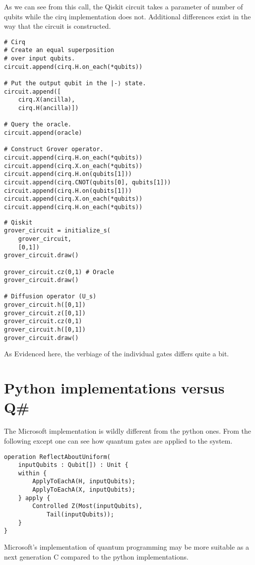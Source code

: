 \documentclass[conference]{IEEEtran}
\begin{document}
As we can see from this call, the Qiskit circuit takes a parameter of number of qubits while the cirq implementation does not. 
Additional differences exist in the way that the circuit is constructed. 

\begin{verbatim}
# Cirq
# Create an equal superposition 
# over input qubits.
circuit.append(cirq.H.on_each(*qubits))

# Put the output qubit in the |-⟩ state.
circuit.append([
    cirq.X(ancilla), 
    cirq.H(ancilla)])

# Query the oracle.
circuit.append(oracle)

# Construct Grover operator.
circuit.append(cirq.H.on_each(*qubits))
circuit.append(cirq.X.on_each(*qubits))
circuit.append(cirq.H.on(qubits[1]))
circuit.append(cirq.CNOT(qubits[0], qubits[1]))
circuit.append(cirq.H.on(qubits[1]))
circuit.append(cirq.X.on_each(*qubits))
circuit.append(cirq.H.on_each(*qubits))
\end{verbatim}

\begin{verbatim}
# Qiskit
grover_circuit = initialize_s(
    grover_circuit, 
    [0,1])
grover_circuit.draw()

grover_circuit.cz(0,1) # Oracle
grover_circuit.draw()

# Diffusion operator (U_s)
grover_circuit.h([0,1])
grover_circuit.z([0,1])
grover_circuit.cz(0,1)
grover_circuit.h([0,1])
grover_circuit.draw()

\end{verbatim}

As Evidenced here, the verbiage of the individual gates differs quite a bit. 

\section{Python implementations versus Q\#}
The Microsoft implementation is wildly different from the python ones. 
From the following except one can see how quantum gates are applied to the system. 
\begin{verbatim}
operation ReflectAboutUniform(
    inputQubits : Qubit[]) : Unit {
    within {
        ApplyToEachA(H, inputQubits);
        ApplyToEachA(X, inputQubits);
    } apply {
        Controlled Z(Most(inputQubits), 
            Tail(inputQubits));
    }
}
\end{verbatim}
Microsoft's implementation of quantum programming may be more suitable as a next generation C compared to the python implementations. 
\end{document}

